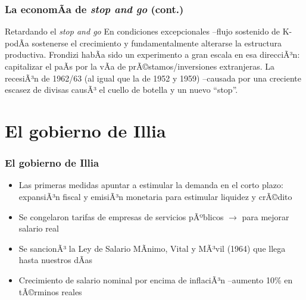 \documentclass[14pt,aspectratio=169]{beamer}
\begin{document}
\begin{frame}\frametitle{La economÃ­a de \textit{stop and go} (cont.)}
  \begin{block}{Retardando el \textit{stop and go}}
En condiciones excepcionales --flujo sostenido de K- podÃ­a sostenerse
el crecimiento y fundamentalmente alterarse la estructura
productiva. Frondizi habÃ­a sido un experimento a gran escala en esa
direcciÃ³n: capitalizar el paÃ­s por la vÃ­a de prÃ©stamos/inversiones
extranjeras. La recesiÃ³n de 1962/63 (al igual que la de 1952 y 1959)
--causada por una creciente escasez de divisas causÃ³ el cuello de
botella y un nuevo ``stop''. 
    \end{block}
               \end{frame}
               
\section{El gobierno de Illia}


                \begin{frame}\frametitle{El gobierno de Illia}
                 \begin{itemize}\itemsep 5pt \medskip
                 \item Las primeras medidas apuntar a estimular la
                   demanda en el corto plazo: expansiÃ³n fiscal y
                   emisiÃ³n monetaria para estimular liquidez y crÃ©dito
                   \item Se congelaron tarifas de empresas de
                     servicios pÃºblicos $\longrightarrow$ para mejorar
                     salario real
                     \item Se sancionÃ³ la Ley de Salario MÃ­nimo, Vital
                       y MÃ³vil (1964) que llega hasta nuestros dÃ­as
                       \item Crecimiento de salario nominal por encima
                         de inflaciÃ³n --aumento 10\% en tÃ©rminos reales
                   \end{itemize}
               \end{frame}
\end{document}
